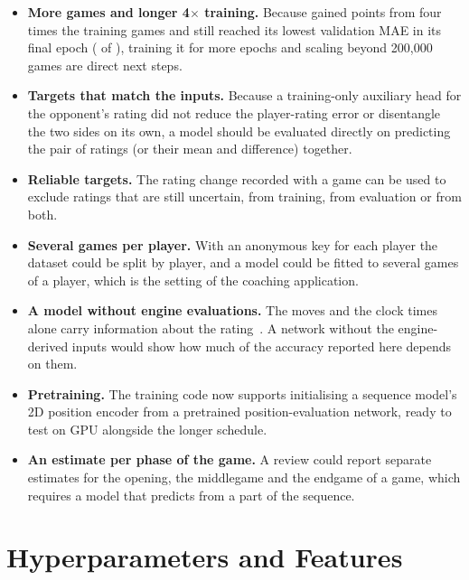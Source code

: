 \documentclass[11pt]{article}
\begin{document}
\begin{itemize}
\item \textbf{More games and longer 4$\times$ training.} Because
 gained 
points from four times the training games and still reached its lowest
validation MAE in its final epoch ( of ),
training it for more epochs and scaling beyond 200{,}000 games are direct next
steps.
\item \textbf{Targets that match the inputs.} Because a training-only auxiliary
head for the opponent's rating did not reduce the player-rating error or
disentangle the two sides on its own, a model should be evaluated directly on
predicting the pair of ratings (or their mean and difference) together.
\item \textbf{Reliable targets.} The rating change recorded with a game can
be used to exclude ratings that are still uncertain, from training, from
evaluation or from both.
\item \textbf{Several games per player.} With an anonymous key for each
player the dataset could be split by player, and a model could be fitted to
several games of a player, which is the setting of the coaching application.
\item \textbf{A model without engine evaluations.} The moves and the clock
times alone carry information about the rating~\cite{ratingnet}. A network
without the engine-derived inputs would show how much of the accuracy
reported here depends on them.
\item \textbf{Pretraining.} The training code now supports initialising a
sequence model's 2D position encoder from a pretrained position-evaluation
network, ready to test on GPU alongside the longer schedule.
\item \textbf{An estimate per phase of the game.} A review could report
separate estimates for the opening, the middlegame and the endgame of a game,
which requires a model that predicts from a part of the sequence.
\end{itemize}




\clearpage
\appendix

\section{Hyperparameters and Features}

\begin{table}[htbp]\centering\footnotesize
{}
\caption{Hyperparameters of the networks of the fixed sequence, from their
configuration files. \emph{Encoder}, \emph{Width}, \emph{Layers} and \emph{Heads} describe the
position encoder. \emph{Seq.\ heads} and \emph{seq.\ layers} are the
attention heads and the layers of the transformer over the sequence.
\emph{LR} is the peak learning rate. Values shared by all of them are given
below the table.}
\label{tab:settings}
\end{table}
\end{document}
